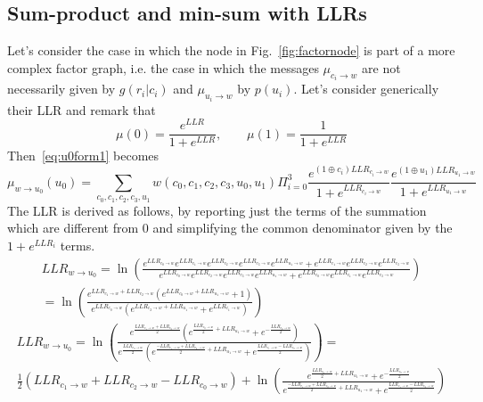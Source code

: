 \documentclass[10pt]{article}
\begin{document}
\subsection*{Sum-product and min-sum with LLRs}
Let's consider the case in which the node in Fig.~\ref{fig:factornode} is part of a more complex factor graph, i.e. the case in which the messages $\mu_{c_i \rightarrow w}$ are not necessarily given by $g(r_i|c_i)$ and $\mu_{u_i \rightarrow w}$ by $p(u_i)$. Let's consider generically their LLR and remark that
\begin{equation}
	\mu(0) = \frac{e^{LLR}}{1+e^{LLR}}, \quad \quad \mu(1) = \frac{1}{1+e^{LLR}}
\end{equation}
Then~\eqref{eq:u0form1} becomes
\begin{equation}
	\mu_{w\rightarrow u_0} (u_0) = \sum_{c_0, c_1, c_2, c_3, u_1} w(c_0, c_1, c_2, c_3, u_0, u_1) \Pi_{i=0}^{3} \frac{e^{(1\oplus c_i)LLR_{c_i\rightarrow w}}}{1+e^{LLR_{c_i\rightarrow w}}} \frac{e^{(1\oplus u_1)LLR_{u_1\rightarrow w}}}{1+e^{LLR_{u_1\rightarrow w}}}
\end{equation}
The LLR is derived as follows, by reporting just the terms of the summation which are different from 0 and simplifying the common denominator given by the $1+e^{LLR_i}$ terms.
\begin{multline}
	LLR_{w\rightarrow u_0} = \ln \left(
				\frac{e^{LLR_{c_0 \rightarrow w}}e^{LLR_{c_1 \rightarrow w}}e^{LLR_{c_2 \rightarrow w}}e^{LLR_{c_3 \rightarrow w}}e^{LLR_{u_1 \rightarrow w}} + e^{LLR_{c_1 \rightarrow w}}e^{LLR_{c_2 \rightarrow w}}e^{LLR_{c_3 \rightarrow w}}}
				{e^{LLR_{c_0 \rightarrow w}}e^{LLR_{c_2 \rightarrow w}}e^{LLR_{c_3 \rightarrow w}}e^{LLR_{u_1 \rightarrow w}} + e^{LLR_{c_0 \rightarrow w}}e^{LLR_{c_1 \rightarrow w}}e^{LLR_{c_3 \rightarrow w}}}
				\right) \\
 		= \ln \left(
			\frac{e^{LLR_{c_1 \rightarrow w}+ LLR_{c_2 \rightarrow w}}(e^{LLR_{c_0 \rightarrow w} + LLR_{u_1 \rightarrow w}} + 1)}
			{e^{LLR_{c_0 \rightarrow w}}(e^{LLR_{c_2 \rightarrow w}+LLR_{u_1 \rightarrow w}} + e^{LLR_{c_1 \rightarrow w}})}	
		\right)
\end{multline}
\begin{multline}\label{eq:LLRmin0}
	LLR_{w\rightarrow u_0} = \ln \left(
						\frac{e^{\frac{LLR_{c_1 \rightarrow w}+ LLR_{c_2 \rightarrow w}}{2}}(e^{\frac{LLR_{c_0 \rightarrow w}}{2} + LLR_{u_1 \rightarrow w}} + e^{-\frac{LLR_{c_0 \rightarrow w}}{2}})}
						{e^{\frac{LLR_{c_0 \rightarrow w}}{2}}(e^{\frac{-LLR_{c_1 \rightarrow w}+ LLR_{c_2 \rightarrow w}}{2}+LLR_{u_1 \rightarrow w}} + e^{\frac{LLR_{c_1 \rightarrow w}- LLR_{c_2 \rightarrow w}}{2}})}								
							\right) = \\
						\frac{1}{2}(LLR_{c_1 \rightarrow w} + LLR_{c_2 \rightarrow w} - LLR_{c_0 \rightarrow w}) + \ln \left(
						\frac{e^{\frac{LLR_{c_0 \rightarrow w}}{2} + LLR_{u_1 \rightarrow w}} + e^{-\frac{LLR_{c_0 \rightarrow w}}{2}}}
						{e^{\frac{-LLR_{c_1 \rightarrow w}+ LLR_{c_2 \rightarrow w}}{2}+LLR_{u_1 \rightarrow w}} + e^{\frac{LLR_{c_1 \rightarrow w}- LLR_{c_2 \rightarrow w}}{2}}}								
							\right)
\end{multline}
\end{document}
